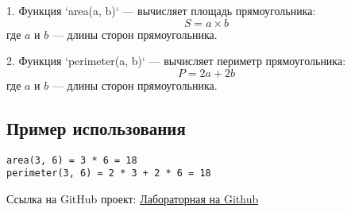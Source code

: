 \documentclass{article}
\begin{document}
1. Функция `area(a, b)` — вычисляет площадь прямоугольника:
   \[
   S = a \times b
   \]
   где \( a \) и \( b \) — длины сторон прямоугольника.

2. Функция `perimeter(a, b)` — вычисляет периметр прямоугольника:
   \[
   P = 2a + 2b
   \]
   где \( a \) и \( b \) — длины сторон прямоугольника.

\subsection{Пример использования}

\begin{verbatim}
area(3, 6) = 3 * 6 = 18
perimeter(3, 6) = 2 * 3 + 2 * 6 = 18
\end{verbatim}

Ссылка на GitHub проект: \textcolor{blue}{\href{https://github.com/Artem-Tev/Lab3-LaTeX}{Лабораторная на Github}}
\end{document}
